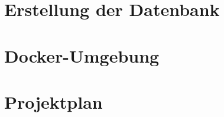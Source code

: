 \begin{appendices}
\section{Erstellung der Datenbank}

\section{Docker-Umgebung}



\section{Projektplan}



\end{appendices}
